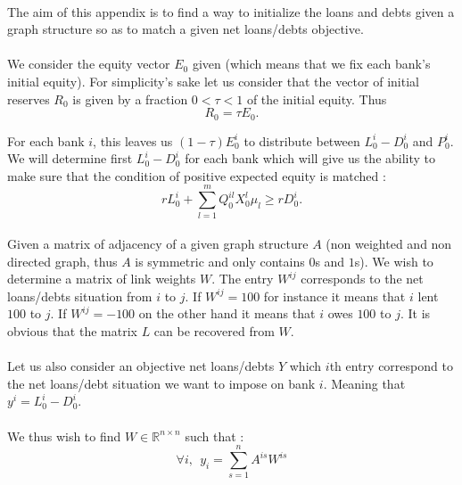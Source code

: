 \documentclass{article}
\begin{document}
\begin{appendices}
\paragraph{}
The aim of this appendix is to find a way to initialize the loans and debts given a graph structure so as to match a given net loans/debts objective. 

\paragraph{}
We consider the equity vector $E_0$ given (which means that we fix each bank's initial equity). For simplicity's sake let us consider that the vector of initial reserves $R_0$ is given by a fraction $0 < \tau < 1$ of the initial equity. Thus 
$$R_0 = \tau E_0.$$

For each bank $i$, this leaves us $(1-\tau)E^i_0$ to distribute between $L_0^i - D_0^i$ and $P_0^i$. We will determine first $L_0^i - D_0^i$ for each bank which will give us the ability to make sure that the condition of positive expected equity is matched :
$$rL_0^i + \sum_{l=1}^{m} Q_0^{il} X_0^l\mu_l \geq rD_0^i.$$

\paragraph{}
Given a matrix of adjacency of a given graph structure $A$ (non weighted and non directed graph, thus $A$ is symmetric and only contains $0$s and $1$s). We wish to determine a matrix of link weights $W$. The entry $W^{ij}$ corresponds to the net loans/debts situation from $i$ to $j$. If $W^{ij} = 100$ for instance it means that $i$ lent $100$ to $j$. If $W^{ij} = -100$ on the other hand it means that $i$ owes $100$ to $j$. It is obvious that the matrix $L$ can be recovered from $W$.

\paragraph{}
Let us also consider an objective net loans/debts $Y$ which $i$th entry correspond to the net loans/debt situation we want to impose on bank $i$. Meaning that $y^i = L_0^i - D_0^i$.

\paragraph{}
We thus wish to find $W \in \mathbb{R}^{n \times n}$ such that : 
$$\forall i,~~ y_i = \sum_{s=1}^n A^{is}W^{is}$$


\end{appendices}
\end{document}
